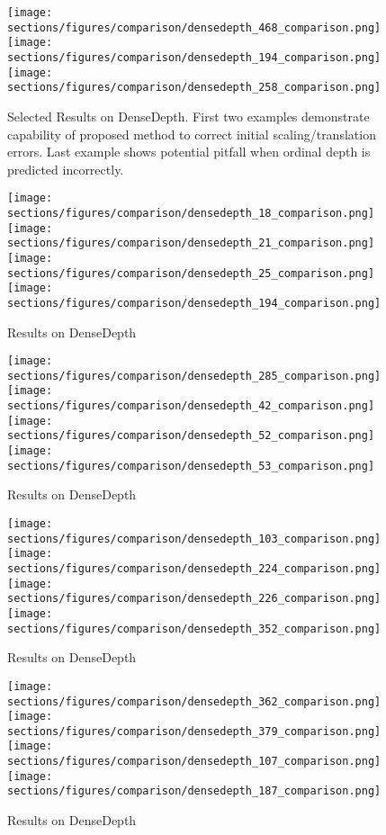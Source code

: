 \begin{figure*}
  \texttt{[image: sections/figures/comparison/densedepth\_468\_comparison.png]}
  \texttt{[image: sections/figures/comparison/densedepth\_194\_comparison.png]}
  \texttt{[image: sections/figures/comparison/densedepth\_258\_comparison.png]}
  \caption{Selected Results on DenseDepth. First two examples demonstrate
    capability of proposed method to correct initial scaling/translation errors.
    Last example shows potential pitfall when ordinal depth is predicted incorrectly.}
\end{figure*}

\begin{figure*}
  \texttt{[image: sections/figures/comparison/densedepth\_18\_comparison.png]}
  \texttt{[image: sections/figures/comparison/densedepth\_21\_comparison.png]}
  \texttt{[image: sections/figures/comparison/densedepth\_25\_comparison.png]}
  \texttt{[image: sections/figures/comparison/densedepth\_194\_comparison.png]}
  \caption{Results on DenseDepth}
\end{figure*}
\begin{figure*}
  \texttt{[image: sections/figures/comparison/densedepth\_285\_comparison.png]}
  \texttt{[image: sections/figures/comparison/densedepth\_42\_comparison.png]}
  \texttt{[image: sections/figures/comparison/densedepth\_52\_comparison.png]}
  \texttt{[image: sections/figures/comparison/densedepth\_53\_comparison.png]}
  \caption{Results on DenseDepth}
\end{figure*}
\begin{figure*}
  \texttt{[image: sections/figures/comparison/densedepth\_103\_comparison.png]}
  \texttt{[image: sections/figures/comparison/densedepth\_224\_comparison.png]}
  \texttt{[image: sections/figures/comparison/densedepth\_226\_comparison.png]}
  \texttt{[image: sections/figures/comparison/densedepth\_352\_comparison.png]}
  \caption{Results on DenseDepth}
\end{figure*}
\begin{figure*}
  \texttt{[image: sections/figures/comparison/densedepth\_362\_comparison.png]}
  \texttt{[image: sections/figures/comparison/densedepth\_379\_comparison.png]}
  \texttt{[image: sections/figures/comparison/densedepth\_107\_comparison.png]}
  \texttt{[image: sections/figures/comparison/densedepth\_187\_comparison.png]}
  \caption{Results on DenseDepth}
\end{figure*}
